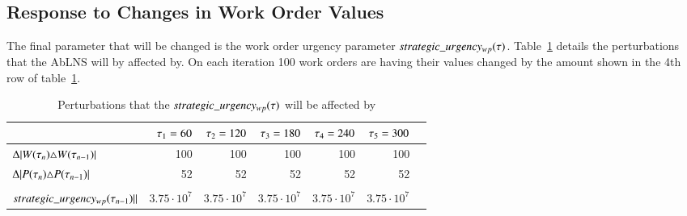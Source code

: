 \subsection{Response to Changes in Work Order Values}\label{sec:results:strategic_value_changes}
The final parameter that will be changed is the work order urgency parameter
$\ParStrategicUrgency$. Table~\ref{tab:responses:urgency-change} details the
perturbations that the AbLNS will by affected by. On each iteration 100 work
orders are having their values changed by the amount  shown in the 4th row of
table~\ref{tab:responses:urgency-change}.

\begin{table}[H]
	\centering
	\begin{tabular}{lrrrrrr}
	\toprule
	                                                                                                                   & $\VarMetaTime_1 = 60$ & $\VarMetaTime_2 = 120$ & $\VarMetaTime_3 = 180$ & $\VarMetaTime_4 = 240$ & $\VarMetaTime_5 = 300$ \\ \midrule
	$\Delta |\SetWorkOrder[\VarMetaTime_{n}]{} \triangle \SetWorkOrder[\VarMetaTime_{n-1}]{}              |$           & 100                                                           & 100                                                            & 100                                                            & 100                                                            & 100                                                      \\ \midrule
	$\Delta |\SetPeriod[\VarMetaTime_{n}]{} \triangle \SetPeriod[\VarMetaTime_{n-1}]{}                    |$           & 52                                                            & 52                                                             & 52                                                             & 52                                                             & 52                                                       \\ \midrule
	\makecell{$ ||\ParStrategicUrgency[\VarMetaTime_{n}] -$\\ $\ParStrategicUrgency[\VarMetaTime_{n - 1}]||$}        & $3.75 \cdot 10^{7}$                                           & $3.75 \cdot 10^{7}$                                            & $3.75 \cdot 10^{7}$                                            & $3.75 \cdot 10^{7}$                                            & $3.75 \cdot 10^{7}$                                       \\ \bottomrule
	\end{tabular}
	\caption{Perturbations that the $\ParStrategicUrgency$ will be affected by
	}\label{tab:responses:urgency-change}
\end{table}

